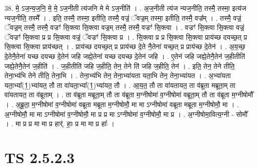 \documentclass[17pt]{extarticle}
\begin{document}
38. मे॒ ऽज॒न्य॒ज॒नि॒ मे॒ मे॒ ऽज॒नीती त्य॑जनि मे मे ऽज॒नीति॑ । . अ॒ज॒नीती त्य॑ज न्यज॒नीति॒ तस्मै॒ तस्मा॒ इत्य॑ज न्यज॒नीति॒ तस्मै᳚ । . इति॒ तस्मै॒ तस्मा॒ इतीति॒ तस्मै॒ वज्रं॒ ॅवज्र॒म् तस्मा॒ इतीति॒ तस्मै॒ वज्र᳚म् । . तस्मै॒ वज्रं॒ ॅवज्र॒म् तस्मै॒ तस्मै॒ वज्रꣳ॑ सि॒क्त्वा सि॒क्त्वा वज्र॒म् तस्मै॒ तस्मै॒ वज्रꣳ॑ सि॒क्त्वा । . वज्रꣳ॑ सि॒क्त्वा सि॒क्त्वा वज्रं॒ ॅवज्रꣳ॑ सि॒क्त्वा प्र प्र सि॒क्त्वा वज्रं॒ ॅवज्रꣳ॑ सि॒क्त्वा प्र । . सि॒क्त्वा प्र प्र सि॒क्त्वा सि॒क्त्वा प्राय॑च्छ दयच्छ॒त् प्र सि॒क्त्वा सि॒क्त्वा प्राय॑च्छत् । . प्राय॑च्छ दयच्छ॒त् प्र प्राय॑च्छ दे॒ते नै॒तेना॑ यच्छ॒त् प्र प्राय॑च्छ दे॒तेन॑ । . अ॒य॒च्छ॒ दे॒तेनै॒तेना॑ यच्छ दयच्छ दे॒तेन॑ जहि जह्ये॒तेना॑ यच्छ दयच्छ दे॒तेन॑ जहि । . ए॒तेन॑ जहि जह्ये॒तेनै॒तेन॑ ज॒हीतीति॑ जह्ये॒तेनै॒तेन॑ ज॒हीति॑ । . ज॒हीतीति॑ जहि ज॒हीति॒ तेन॒ तेने ति॑ जहि ज॒हीति॒ तेन॑ । . इति॒ तेन॒ तेने तीति॒ तेना॒भ्य॑भि तेने तीति॒ तेना॒भि । . तेना॒भ्य॑भि तेन॒ तेना॒भ्या॑यता यता॒भि तेन॒ तेना॒भ्या॑यत । . अ॒भ्या॑यता यता॒भ्या᳚(1॒)भ्या॑यत॒ तौ ता वा॑यता॒भ्या᳚(1॒)भ्या॑यत॒ तौ । . आ॒य॒त॒ तौ ता वा॑यतायत॒ ता व॑ब्रूता मब्रूता॒म् ता वा॑यतायत॒ ता व॑ब्रूताम् । . ता व॑ब्रूता मब्रूता॒म् तौ ता व॑ब्रूता म॒ग्नीषोमा॑ व॒ग्नीषोमा॑ वब्रूता॒म् तौ ता व॑ब्रूता म॒ग्नीषोमौ᳚ । . अ॒ब्रू॒ता॒ म॒ग्नीषोमा॑ व॒ग्नीषोमा॑ वब्रूता मब्रूता म॒ग्नीषोमौ॒ मा मा ऽग्नीषोमा॑ वब्रूता मब्रूता म॒ग्नीषोमौ॒ मा । . अ॒ग्नीषोमौ॒ मा मा ऽग्नीषोमा॑ व॒ग्नीषोमौ॒ मा प्र प्र मा ऽग्नीषोमा॑ व॒ग्नीषोमौ॒ मा प्र । . अ॒ग्नीषोमा॒वित्य॒ग्नी - सोमौ᳚ । . मा प्र प्र मा मा प्र हार्॑. हाः॒ प्र मा मा प्र हाः᳚ । \newline
\pagebreak
{}
\section*{ TS 2.5.2.3 }
\end{document}
